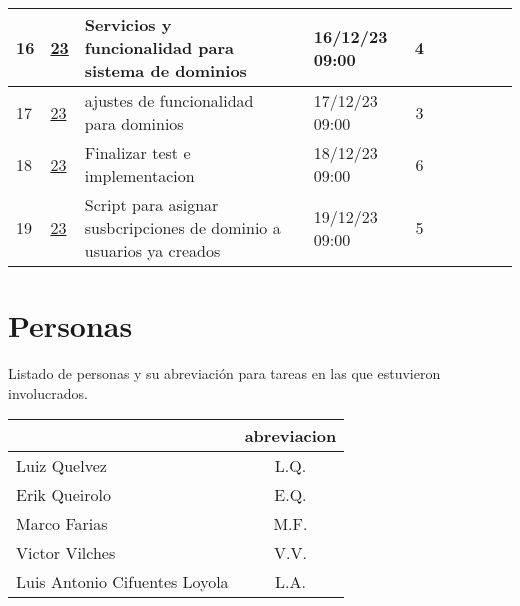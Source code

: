 \documentclass{article}
\begin{document}
\begin{longtable}{|m{0.5cm}|m{1.2cm}|p{5cm}|m{1.5cm}|m{1.5cm}||c|c|c|c|c|c|    |}
                 \label{16}16  &  \hyperref[23]{\color{blue}23}  & Servicios y funcionalidad para sistema de dominios &  
                 & 16/12/23 09:00  & 4 &  &  &  &  & \\ \hline 

                 \label{17}17  &  \hyperref[23]{\color{blue}23}  & ajustes de funcionalidad para dominios &  
                 & 17/12/23 09:00  & 3 &  &  &  &  & \\ \hline 

                 \label{18}18  &  \hyperref[23]{\color{blue}23}  & Finalizar test e implementacion &  
                 & 18/12/23 09:00  & 6 &  &  &  &  & \\ \hline 

                 \label{19}19  &  \hyperref[23]{\color{blue}23}  & Script para asignar susbcripciones de dominio a usuarios ya creados &  
                 & 19/12/23 09:00  & 5 &  &  &  &  & \\ \hline 

    \end{longtable} 
 \newpage
\section{Personas}
Listado de personas y su abreviación para tareas en las que estuvieron involucrados.
\begin{table}[htbp]
    \centering
    \begin{tabular}{|p{6cm}|c|}
        \hline
        \centering{\textbf{Nombre}} & \textbf{abreviacion} \\ \hline
        Luiz Quelvez &  \label{L.Q.}L.Q.  \\ \hline
        Erik Queirolo &  \label{E.Q.}E.Q.  \\ \hline
        Marco Farias &  \label{M.F.}M.F.  \\ \hline
        Victor Vilches &  \label{V.V.}V.V.  \\ \hline
        Luis Antonio Cifuentes Loyola &  \label{L.A.}L.A.  \\ \hline
    \end{tabular}
\end{table} 
 
\end{document}

